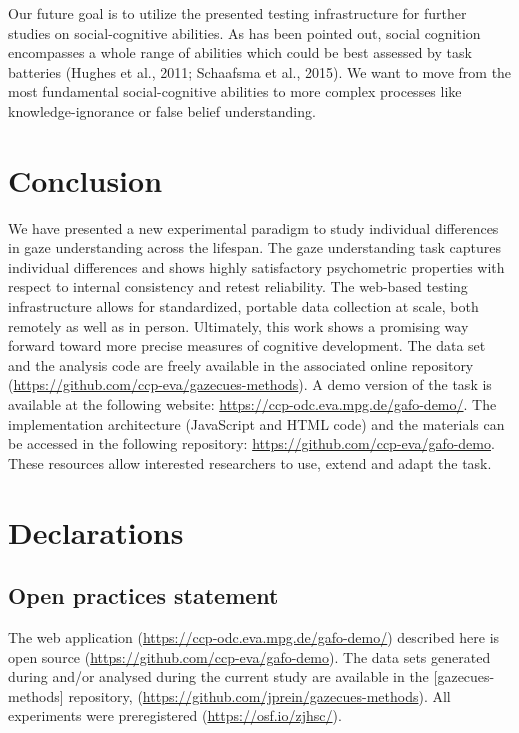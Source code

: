 \documentclass[
  man,floatsintext]{apa6}
\begin{document}
Our future goal is to utilize the presented testing infrastructure for further studies on social-cognitive abilities.
As has been pointed out, social cognition encompasses a whole range of abilities which could be best assessed by task batteries (Hughes et al., 2011; Schaafsma et al., 2015).
We want to move from the most fundamental social-cognitive abilities to more complex processes like knowledge-ignorance or false belief understanding.

\hypertarget{conclusion}{%
\section{Conclusion}\label{conclusion}}

We have presented a new experimental paradigm to study individual differences in gaze understanding across the lifespan.
The gaze understanding task captures individual differences and shows highly satisfactory psychometric properties with respect to internal consistency and retest reliability.
The web-based testing infrastructure allows for standardized, portable data collection at scale, both remotely as well as in person.
Ultimately, this work shows a promising way forward toward more precise measures of cognitive development.
The data set and the analysis code are freely available in the associated online repository (\url{https://github.com/ccp-eva/gazecues-methods}).
A demo version of the task is available at the following website: \url{https://ccp-odc.eva.mpg.de/gafo-demo/}.
The implementation architecture (JavaScript and HTML code) and the materials can be accessed in the following repository: \url{https://github.com/ccp-eva/gafo-demo}.
These resources allow interested researchers to use, extend and adapt the task.

\newpage

\hypertarget{declarations}{%
\section{Declarations}\label{declarations}}

\hypertarget{open-practices-statement}{%
\subsection{Open practices statement}\label{open-practices-statement}}

The web application (\url{https://ccp-odc.eva.mpg.de/gafo-demo/}) described here is open source (\url{https://github.com/ccp-eva/gafo-demo}).
The data sets generated during and/or analysed during the current study are available in the {[}gazecues-methods{]} repository, (\url{https://github.com/jprein/gazecues-methods}).
All experiments were preregistered (\url{https://osf.io/zjhsc/}).
\end{document}
